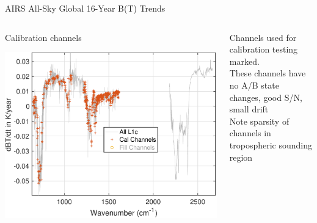 \documentclass[10pt,t]{beamer}
\begin{document}
\begin{frame}[label={sec:orgbce5e15}]{AIRS All-Sky Global 16-Year B(T) Trends}
\vspace{-0.25in}

\begin{columns}
\begin{column}{0.55\columnwidth}
\begin{block}{\footnotesize Calibration channels}
\vspace{-0.1in}
\begin{center}
\includegraphics[width=0.75\linewidth]{./Figs/Pdf/rand_global_trend_l1c_overview_calfit_marked.pdf}
\end{center}
\end{block}
\end{column}


\begin{column}{0.55\columnwidth}
\begin{block}{\footnotesize}
\begin{footnotesize}
Channels used for calibration testing marked.\\
\vspace{0.05in}
These channels have no A/B state changes, good S/N, small drift\\
\vspace{0.05in}
Note sparsity of \cd channels in tropospheric sounding region\\
\end{footnotesize}
\end{block}
\end{column}
\end{columns}
\end{frame}
\end{document}
